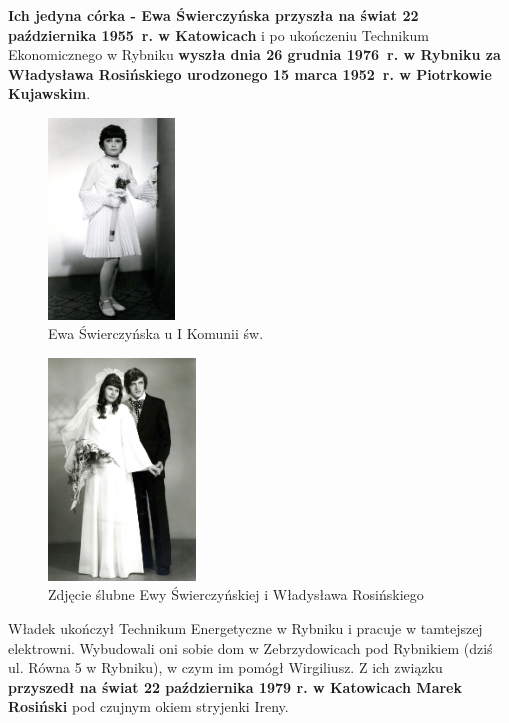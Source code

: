 \textbf{Ich jedyna córka - Ewa Świerczyńska przyszła na świat 22 października 1955~r. w Katowicach} i po ukończeniu Technikum Ekonomicznego w Rybniku \textbf{wyszła dnia 26 grudnia 1976~r. w Rybniku za Władysława Rosińskiego urodzonego 15 marca 1952~r. w Piotrkowie Kujawskim}.

\begin{figure}[!h]
\begin{center}
\includegraphics[width=0.3\textwidth]{photo/ewa_swierczynska.jpg}
\caption{Ewa Świerczyńska u I Komunii św.}
\label{rys:ewa_swierczynska}
\end{center}
\end{figure}

\begin{figure}[!h]
\begin{center}
\includegraphics[width=0.35\textwidth]{photo/ewa_wladyslaw_rosinscy_slub}
\caption{Zdjęcie ślubne Ewy Świerczyńskiej i Władysława Rosińskiego}
\label{rys:ewa_wladyslaw_rosinscy_slub}
\end{center}
\end{figure}

Władek ukończył Technikum Energetyczne w Rybniku i pracuje w tamtejszej elektrowni. Wybudowali oni sobie dom w Zebrzydowicach pod Rybnikiem (dziś ul. Równa 5 w Rybniku), w czym im pomógł Wirgiliusz. Z ich związku \textbf{przyszedł na świat 22 października 1979 r. w Katowicach Marek Rosiński} pod czujnym okiem stryjenki Ireny.


